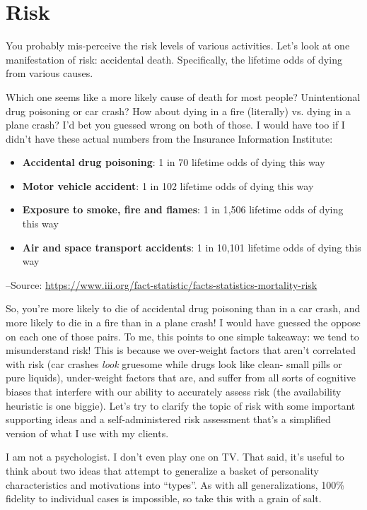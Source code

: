 \chapter{Risk}

You probably mis-perceive the risk levels of various activities. Let's look at one manifestation of risk: accidental death. Specifically, the lifetime odds of dying from various causes.

Which one seems like a more likely cause of death for most people? Unintentional drug poisoning or car crash? How about dying in a fire (literally) vs. dying in a plane crash? I'd bet you guessed wrong on both of those. I would have too if I didn't have these actual numbers from the Insurance Information Institute:

\begin{itemize}
\item \textbf{Accidental drug poisoning}: 1 in 70 lifetime odds of dying this way
\item \textbf{Motor vehicle accident}: 1 in 102 lifetime odds of dying this way
\item \textbf{Exposure to smoke, fire and flames}: 1 in 1,506 lifetime odds of dying this way
\item \textbf{Air and space transport accidents}: 1 in 10,101 lifetime odds of dying this way
\end{itemize}

--Source: \href{https://www.iii.org/fact-statistic/facts-statistics-mortality-risk}{https://www.iii.org/fact-statistic/facts-statistics-mortality-risk}

So, you're more likely to die of accidental drug poisoning than in a car crash, and more likely to die in a fire than in a plane crash! I would have guessed the oppose on each one of those pairs. To me, this points to one simple takeaway: we tend to misunderstand risk! This is because we over-weight factors that aren't correlated with risk (car crashes \emph{look} gruesome while drugs look like clean- small pills or pure liquids), under-weight factors that are, and suffer from all sorts of cognitive biases that interfere with our ability to accurately assess risk (the availability heuristic is one biggie). Let's try to clarify the topic of risk with some important supporting ideas and a self-administered risk assessment that's a simplified version of what I use with my clients.

I am not a psychologist. I don't even play one on TV. That said, it's useful to think about two ideas that attempt to generalize a basket of personality characteristics and motivations into ``types''. As with all generalizations, 100\% fidelity to individual cases is impossible, so take this with a grain of salt.

